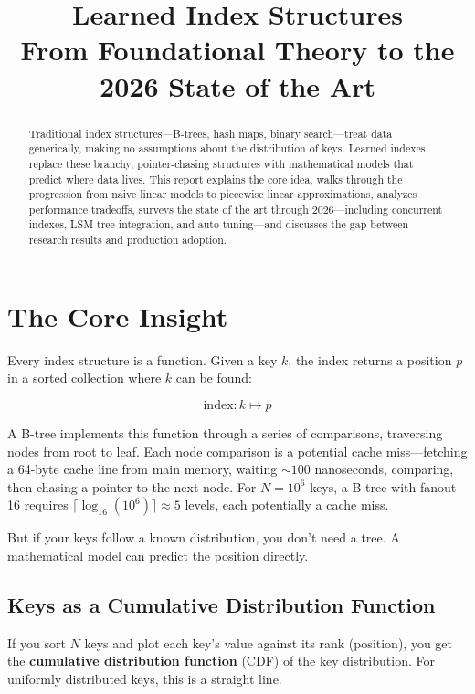 \documentclass[11pt, a4paper]{article}
\title{\textbf{Learned Index Structures}\\[0.3em]
\large From Foundational Theory to the 2026 State of the Art}
\author{}
\date{}
\begin{document}
\maketitle

\begin{abstract}
Traditional index structures---B-trees, hash maps, binary search---treat data generically,
making no assumptions about the distribution of keys. Learned indexes replace these
branchy, pointer-chasing structures with mathematical models that predict where data lives.
This report explains the core idea, walks through the progression from naive linear models
to piecewise linear approximations, analyzes performance tradeoffs, surveys the state
of the art through 2026---including concurrent indexes, LSM-tree integration, and
auto-tuning---and discusses the gap between research results and production adoption.
\end{abstract}

\tableofcontents
\newpage

\section{The Core Insight}

Every index structure is a function. Given a key $k$, the index returns a position $p$
in a sorted collection where $k$ can be found:

\[
    \text{index}: k \mapsto p
\]

A B-tree implements this function through a series of comparisons, traversing nodes
from root to leaf. Each node comparison is a potential cache miss---fetching a 64-byte
cache line from main memory, waiting ${\sim}100$ nanoseconds, comparing, then chasing
a pointer to the next node. For $N = 10^6$ keys, a B-tree with fanout 16 requires
$\lceil \log_{16}(10^6) \rceil \approx 5$ levels, each potentially a cache miss.

But if your keys follow a known distribution, you don't need a tree. A mathematical
model can predict the position directly.

\subsection{Keys as a Cumulative Distribution Function}

If you sort $N$ keys and plot each key's value against its rank (position), you get
the \textbf{cumulative distribution function} (CDF) of the key distribution. For
uniformly distributed keys, this is a straight line.
\end{document}
